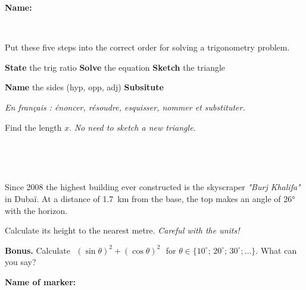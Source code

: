 \documentclass[9pt]{exam}
\begin{document}
\textbf{Name:} \dotfill

\

\begin{questions}

\question[1] Put these five steps into the correct order for solving a trigonometry problem.

\begin{center}
\textbf{State} the trig ratio \hspace{10mm}
\textbf{Solve} the equation \hspace{10mm}
\textbf{Sketch} the triangle

\textbf{Name} the sides (hyp, opp, adj) \hspace{10mm}
\textbf{Subsitute}

\emph{En français : énoncer, résoudre, esquisser, nommer et substituter.}
\end{center} 

\fillwithdottedlines{10mm}

\question[4] Find the length $x$. \emph{No need to sketch a new triangle.}

\

\begin{minipage}{0.4\textwidth}
\end{minipage}
\begin{minipage}{0.55\textwidth}
\fillwithdottedlines{45mm}
\end{minipage}

\

\question[5]  Since 2008 the highest building ever constructed is the skyscraper \emph{"Burj Khalifa"} in Dubaï. At a distance of \SI{1,7}{km} from the base, the top makes an angle of 26° with the horizon. 

Calculate its height to the nearest metre. \emph{Careful with the units!}



\vfill

\question[0] \textbf{Bonus.} Calculate $\,\,(\sin \theta)^2 + (\cos \theta)^2\,\,$ for $\theta \in \{ 10^\circ; \, 20^\circ; \, 30^\circ; \ldots \}$. What can you say?

\end{questions}

\begin{tcolorbox}

\textbf{Name of marker:}

\begin{center}
\gradetable[h][questions]
\end{center}

\end{tcolorbox}
\end{document}
